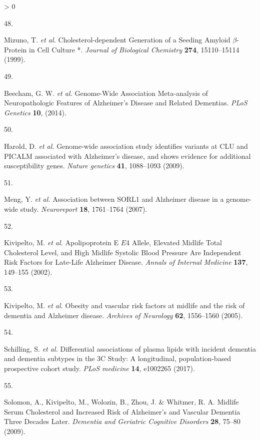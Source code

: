 \documentclass[a4paper, twoside]{templates/ociamthesis}
\newlength{\cslhangindent}
\newlength{\csllabelwidth}
\newenvironment{CSLReferences}[3] %
 {%
  \setlength{\parindent}{0pt}
  \ifodd #1 \everypar{\setlength{\hangindent}{\cslhangindent}}\ignorespaces\fi
  \ifnum #2 > 0
  \setlength{\parskip}{#2\baselineskip}
  \fi
 }%
 {}
\newcommand{\CSLLeftMargin}[1]{\parbox[t]{\maxof{\widthof{#1}}{\csllabelwidth}}{#1}}
\newcommand{\CSLRightInline}[1]{\parbox[t]{\linewidth - \csllabelwidth}{#1}}
\begin{document}
\begin{CSLReferences}{0}{0}
\leavevmode\hypertarget{ref-mizuno1999}{}%
\CSLLeftMargin{48. }
\CSLRightInline{Mizuno, T. \emph{et al.} Cholesterol-dependent {Generation} of a {Seeding Amyloid} {\(\beta\)}-{Protein} in {Cell Culture} *. \emph{Journal of Biological Chemistry} \textbf{274}, 15110--15114 (1999).}

\leavevmode\hypertarget{ref-beecham2014}{}%
\CSLLeftMargin{49. }
\CSLRightInline{Beecham, G. W. \emph{et al.} Genome-{Wide Association Meta}-analysis of {Neuropathologic Features} of {Alzheimer}'s {Disease} and {Related Dementias}. \emph{PLoS Genetics} \textbf{10}, (2014).}

\leavevmode\hypertarget{ref-harold2009}{}%
\CSLLeftMargin{50. }
\CSLRightInline{Harold, D. \emph{et al.} Genome-wide association study identifies variants at {CLU} and {PICALM} associated with {Alzheimer}'s disease, and shows evidence for additional susceptibility genes. \emph{Nature genetics} \textbf{41}, 1088--1093 (2009).}

\leavevmode\hypertarget{ref-meng2007}{}%
\CSLLeftMargin{51. }
\CSLRightInline{Meng, Y. \emph{et al.} Association between {SORL1} and {Alzheimer} disease in a genome-wide study. \emph{Neuroreport} \textbf{18}, 1761--1764 (2007).}

\leavevmode\hypertarget{ref-kivipelto2002}{}%
\CSLLeftMargin{52. }
\CSLRightInline{Kivipelto, M. \emph{et al.} Apolipoprotein {E} {\(E\)}4 {Allele}, {Elevated Midlife Total Cholesterol Level}, and {High Midlife Systolic Blood Pressure Are Independent Risk Factors} for {Late}-{Life Alzheimer Disease}. \emph{Annals of Internal Medicine} \textbf{137}, 149--155 (2002).}

\leavevmode\hypertarget{ref-kivipelto2005}{}%
\CSLLeftMargin{53. }
\CSLRightInline{Kivipelto, M. \emph{et al.} Obesity and vascular risk factors at midlife and the risk of dementia and {Alzheimer} disease. \emph{Archives of Neurology} \textbf{62}, 1556--1560 (2005).}

\leavevmode\hypertarget{ref-schilling2017}{}%
\CSLLeftMargin{54. }
\CSLRightInline{Schilling, S. \emph{et al.} Differential associations of plasma lipids with incident dementia and dementia subtypes in the {3C Study}: A longitudinal, population-based prospective cohort study. \emph{PLoS medicine} \textbf{14}, e1002265 (2017).}

\leavevmode\hypertarget{ref-solomon2009}{}%
\CSLLeftMargin{55. }
\CSLRightInline{Solomon, A., Kivipelto, M., Wolozin, B., Zhou, J. \& Whitmer, R. A. Midlife {Serum Cholesterol} and {Increased Risk} of {Alzheimer}'s and {Vascular Dementia Three Decades Later}. \emph{Dementia and Geriatric Cognitive Disorders} \textbf{28}, 75--80 (2009).}


\end{CSLReferences}
\end{document}
